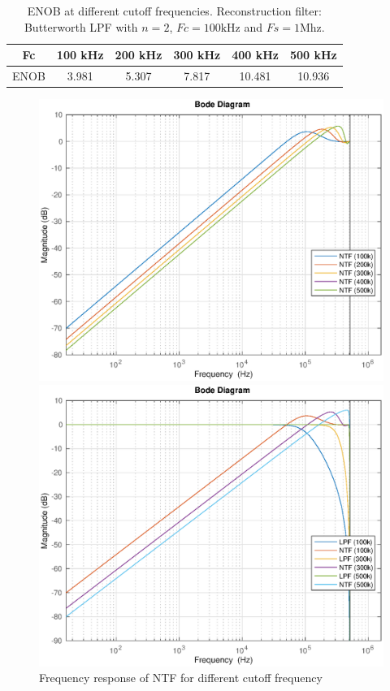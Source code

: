\documentclass[a4paper]{article}
\begin{document}
\begin{table}[!h]
	\caption{ENOB at different cutoff frequencies. Reconstruction filter: Butterworth LPF with $n =2$,  $Fc = 100 \textrm{kHz}$ and $Fs = 1\textrm{Mhz}$.}
	\centering
	\begin{tabular}{|c|c|c|c|c|c|}
	\hline
	Fc & 100 kHz & 200 kHz & 300 kHz & 400 kHz & 500 kHz \\
	\hline
	ENOB & 3.981 & 5.307 & 7.817  & 10.481 & 10.936\\
	\hline
	\end{tabular}	
	
\end{table}

\begin{figure}[!h]
	\centering
	\begin{minipage}{0.45\linewidth}
		\centering	
		\includegraphics[scale = 0.5]{fig_stf_ntf/ntf_vs_freq.eps}
		\caption{Frequency response of NTF for different cutoff frequency}
		\label{fig:NTFvsfreq}
	\end{minipage}
	\hfil
	\begin{minipage}{0.45\linewidth}
		\centering
		\includegraphics[scale = 0.5]{fig_stf_ntf/lpf_ntf_vs_freq.eps}

\end{minipage}
\end{figure}
\end{document}

